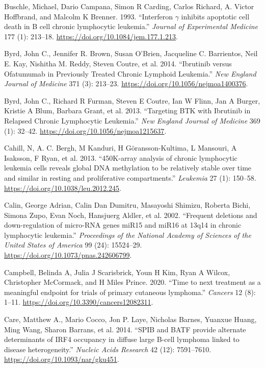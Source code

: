 \documentclass[11pt, a4paper, twosided]{book}
\newenvironment{CSLReferences}%
  {}%
  {\par}
\begin{document}
\begin{CSLReferences}{1}{0}
\leavevmode{}%
Buschle, Michael, Dario Campana, Simon R Carding, Carlos Richard, A. Victor Hoffbrand, and Malcolm K Brenner. 1993. {``{Interferon \(\gamma\) inhibits apoptotic cell death in B cell chronic lymphocytic leukemia}.''} \emph{Journal of Experimental Medicine} 177 (1): 213--18. \url{https://doi.org/10.1084/jem.177.1.213}.

\leavevmode{}%
Byrd, John C., Jennifer R. Brown, Susan O'Brien, Jacqueline C. Barrientos, Neil E. Kay, Nishitha M. Reddy, Steven Coutre, et al. 2014. {``{Ibrutinib versus Ofatumumab in Previously Treated Chronic Lymphoid Leukemia}.''} \emph{New England Journal of Medicine} 371 (3): 213--23. \url{https://doi.org/10.1056/nejmoa1400376}.

\leavevmode{}%
Byrd, John C., Richard R Furman, Steven E Coutre, Ian W Flinn, Jan A Burger, Kristie A Blum, Barbara Grant, et al. 2013. {``{Targeting BTK with Ibrutinib in Relapsed Chronic Lymphocytic Leukemia}.''} \emph{New England Journal of Medicine} 369 (1): 32--42. \url{https://doi.org/10.1056/nejmoa1215637}.

\leavevmode{}%
Cahill, N, A. C. Bergh, M Kanduri, H Göransson-Kultima, L Mansouri, A Isaksson, F Ryan, et al. 2013. {``{450K-array analysis of chronic lymphocytic leukemia cells reveals global DNA methylation to be relatively stable over time and similar in resting and proliferative compartments}.''} \emph{Leukemia} 27 (1): 150--58. \url{https://doi.org/10.1038/leu.2012.245}.

\leavevmode{}%
Calin, George Adrian, Calin Dan Dumitru, Masayoshi Shimizu, Roberta Bichi, Simona Zupo, Evan Noch, Hansjuerg Aldler, et al. 2002. {``{Frequent deletions and down-regulation of micro-RNA genes miR15 and miR16 at 13q14 in chronic lymphocytic leukemia}.''} \emph{Proceedings of the National Academy of Sciences of the United States of America} 99 (24): 15524--29. \url{https://doi.org/10.1073/pnas.242606799}.

\leavevmode{}%
Campbell, Belinda A, Julia J Scarisbrick, Youn H Kim, Ryan A Wilcox, Christopher McCormack, and H Miles Prince. 2020. {``{Time to next treatment as a meaningful endpoint for trials of primary cutaneous lymphoma}.''} \emph{Cancers} 12 (8): 1--11. \url{https://doi.org/10.3390/cancers12082311}.

\leavevmode{}%
Care, Matthew A., Mario Cocco, Jon P. Laye, Nicholas Barnes, Yuanxue Huang, Ming Wang, Sharon Barrans, et al. 2014. {``{SPIB and BATF provide alternate determinants of IRF4 occupancy in diffuse large B-cell lymphoma linked to disease heterogeneity}.''} \emph{Nucleic Acids Research} 42 (12): 7591--7610. \url{https://doi.org/10.1093/nar/gku451}.


\end{CSLReferences}
\end{document}
